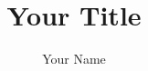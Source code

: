\documentclass[	11pt
				DIV=11		
			]
			{article}
\title{Your Title}
\author{Your Name}
\begin{document}
 \noindent
	\maketitle
	\cleardoublepage
	\tableofcontents
	\cleardoublepage
	
\end{document}

